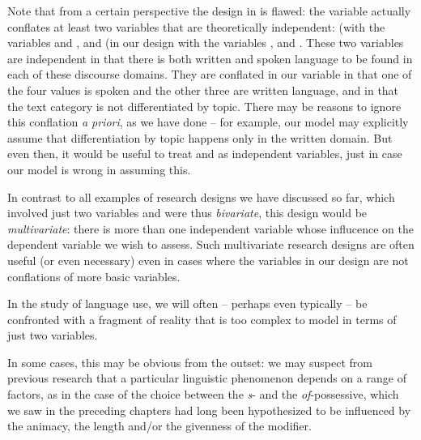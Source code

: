 Note that from a certain perspective the design  in  is flawed: the variable   actually conflates at least two variables that are theoretically independent:   (with the variables  and , and  (in our design with the variables ,    and . These two variables are independent in that there is both written and spoken language to be found in each of these discourse domains. They are conflated in our variable   in that one of the four values is spoken and the other three are written language, and in that the text category  is not differentiated by topic. There may be reasons to ignore this conflation \textit{a priori}, as we have done -- for example, our model may explicitly assume that differentiation by topic happens only in the written domain. But even then, it would be useful to treat   and  as independent variables, just in case our model is wrong in assuming this.

In contrast to all examples of research designs  we have discussed so far, which involved just two variables and were thus \textit{bivariate},  this design would be \textit{multivariate}:  there is more than one independent variable whose influcence on the dependent variable we wish to assess. Such multivariate research designs are often useful (or even necessary) even in cases where the variables in our design are not conflations of more basic variables.

In the study of language use, we will often -- perhaps even typically -- be confronted with a fragment of reality that is too complex to model in terms of just two variables.

In some cases, this may be obvious from the outset: we may suspect from previous research that a particular linguistic phenomenon depends on a range of factors, as in the case of the choice between the \textit{s}- and the \textit{of}-possessive,  which we saw in the preceding chapters had long been hypothesized to be influenced by the animacy,  the length  and\slash or the givenness  of the modifier.

